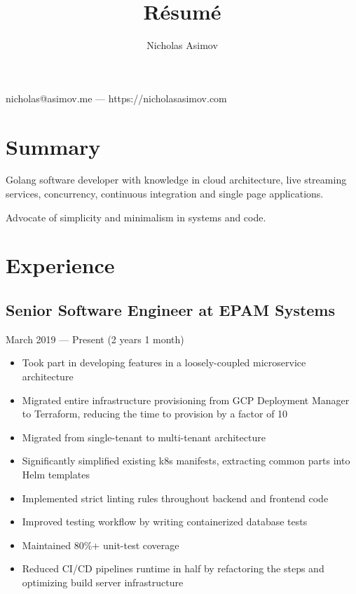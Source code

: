 \documentclass[a4paper,11pt]{article}
\makeatletter
\renewcommand{\maketitle}{
    \begin{center}
        {
            \huge
            \bfseries
            \theauthor
        }
 
        \vspace{.25em}
        nicholas@asimov.me --- https://nicholasasimov.com
    \end{center}
}
\makeatother
\begin{document}
\title{R\'esum\'e}
\author{Nicholas Asimov}

\maketitle

\section{Summary}

Golang software developer with knowledge in cloud architecture, live streaming services, concurrency,
continuous integration and single page applications.
\newline

\noindent
Advocate of simplicity and minimalism in systems and code.

\section{Experience}

\subsection{Senior Software Engineer at EPAM Systems}
March 2019 --- Present (2 years 1 month)
\begin{itemize}[noitemsep]
    \renewcommand{\labelitemi}{---}

    \item Took part in developing features in a loosely-coupled microservice architecture
    \item Migrated entire infrastructure provisioning from GCP Deployment Manager to Terraform, reducing the time to provision by a factor of 10
    \item Migrated from single-tenant to multi-tenant architecture
    \item Significantly simplified existing k8s manifests, extracting common parts into Helm templates
    \item Implemented strict linting rules throughout backend and frontend code
    \item Improved testing workflow by writing containerized database tests
    \item Maintained 80\%+ unit-test coverage
    \item Reduced CI/CD pipelines runtime in half by refactoring the steps and optimizing build server infrastructure
\end{itemize}
\end{document}
